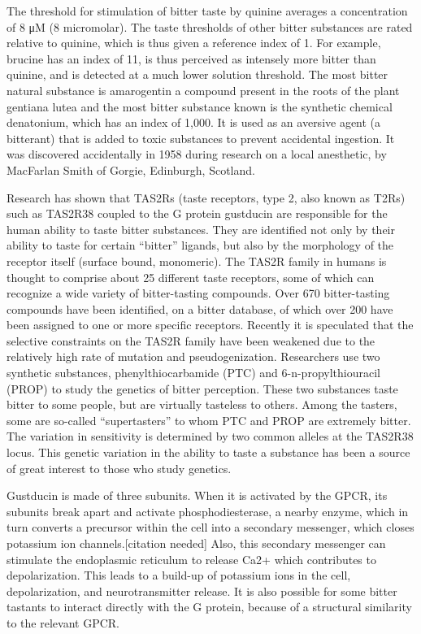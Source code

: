 The threshold for stimulation of bitter taste by quinine averages a concentration of 8 μM (8 micromolar). The taste thresholds of other bitter substances are rated relative to quinine, which is thus given a reference index of 1. For example, brucine has an index of 11, is thus perceived as intensely more bitter than quinine, and is detected at a much lower solution threshold. The most bitter natural substance is amarogentin a compound present in the roots of the plant gentiana lutea and the most bitter substance known is the synthetic chemical denatonium, which has an index of 1,000. It is used as an aversive agent (a bitterant) that is added to toxic substances to prevent accidental ingestion. It was discovered accidentally in 1958 during research on a local anesthetic, by MacFarlan Smith of Gorgie, Edinburgh, Scotland.

Research has shown that TAS2Rs (taste receptors, type 2, also known as T2Rs) such as TAS2R38 coupled to the G protein gustducin are responsible for the human ability to taste bitter substances. They are identified not only by their ability to taste for certain ``bitter'' ligands, but also by the morphology of the receptor itself (surface bound, monomeric). The TAS2R family in humans is thought to comprise about 25 different taste receptors, some of which can recognize a wide variety of bitter-tasting compounds. Over 670 bitter-tasting compounds have been identified, on a bitter database, of which over 200 have been assigned to one or more specific receptors. Recently it is speculated that the selective constraints on the TAS2R family have been weakened due to the relatively high rate of mutation and pseudogenization. Researchers use two synthetic substances, phenylthiocarbamide (PTC) and 6-n-propylthiouracil (PROP) to study the genetics of bitter perception. These two substances taste bitter to some people, but are virtually tasteless to others. Among the tasters, some are so-called ``supertasters'' to whom PTC and PROP are extremely bitter. The variation in sensitivity is determined by two common alleles at the TAS2R38 locus. This genetic variation in the ability to taste a substance has been a source of great interest to those who study genetics.

Gustducin is made of three subunits. When it is activated by the GPCR, its subunits break apart and activate phosphodiesterase, a nearby enzyme, which in turn converts a precursor within the cell into a secondary messenger, which closes potassium ion channels.{[}citation needed{]} Also, this secondary messenger can stimulate the endoplasmic reticulum to release Ca2+ which contributes to depolarization. This leads to a build-up of potassium ions in the cell, depolarization, and neurotransmitter release. It is also possible for some bitter tastants to interact directly with the G protein, because of a structural similarity to the relevant GPCR.

